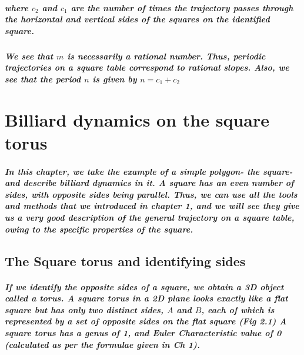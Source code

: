 \documentclass{report}
\begin{document}
\paragraph{where $c_2$ and $c_1$ are the number of times the trajectory passes through the horizontal and vertical sides of the squares on the identified square.}

\paragraph{We see that $m$ is necessarily a rational number. Thus, periodic trajectories on a square table correspond to rational slopes. Also, we see that the period $n$ is given by $n = c_1 + c_2$}






\chapter{Billiard dynamics on the square torus}

\paragraph{In this chapter, we take the example of a simple polygon- the square- and describe billiard dynamics in it. A square has an even number of sides, with opposite sides being parallel. Thus, we can use all the tools and methods that we introduced in chapter 1, and we will see they give us a very good description of the general trajectory on a square table, owing to the specific properties of the square.}

\section{The Square torus and identifying sides}

\paragraph{If we identify the opposite sides of a square, we obtain a 3D object called a torus. A square torus in a 2D plane looks exactly like a flat square but has only two distinct sides, $A$ and $B$, each of which is represented by a set of opposite sides on the flat square (Fig 2.1) A square torus has a genus of 1, and Euler Characteristic value of 0 (calculated as per the formulae given in Ch 1).}
\end{document}
